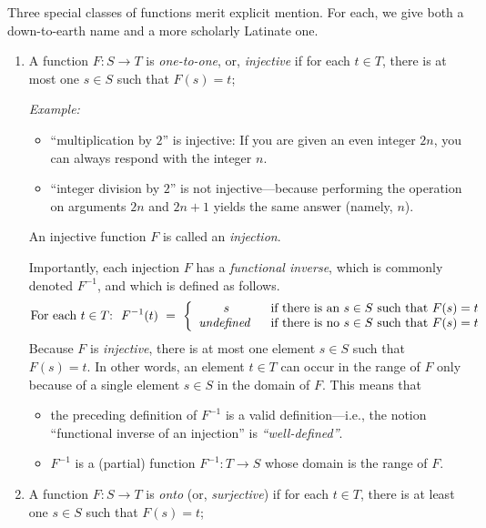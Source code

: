 \medskip

Three special classes of functions merit explicit mention.  For each, we give both a down-to-earth name and a more scholarly Latinate one.
\begin{enumerate}
\item
A function $F: S \rightarrow T$ is {\it one-to-one}, or, {\it injective} if for each $t \in T$, there is at most one $s \in S$ such that $F(s) = t$;

\medskip

{\em Example:}
\begin{itemize}
\item
 ``multiplication by $2$'' is injective: If you are given an even integer $2n$, you can always respond with the integer $n$.
\item
``integer division by $2$'' is not injective---because performing the operation on arguments $2n$ and $2n+1$ yields the same answer (namely, $n$).
\end{itemize}

An injective function $F$ is called an {\it injection}.

\smallskip


Importantly, each injection $F$ has a {\it functional inverse}, which is commonly denoted $F^{-1}$, and which is defined as follows.
\[
\mbox{For each $t \in T$:} \ \
F^{-1}(t) \ = \ \left\{
\begin{array}{cl}
s &
\mbox{ if there is an $s \in S$ such that $F(s) = t$} \\
\mbox{\it undefined } &
\mbox{ if there is no $s \in S$ such that $F(s) = t$}
\end{array}
\right.
\]
Because $F$ is {\em injective}, there is at most one element $s \in S$ such that $F(s)= t$.  In other words, an element $t \in T$ can occur in the range of $F$ only because of a single element $s \in S$ in the domain of $F$.  This means that
\begin{itemize}
\item
the preceding definition of $F^{-1}$ is a valid definition---i.e., the notion ``functional inverse of an injection'' is {\it ``well-defined''}.
\item
$F^{-1}$ is a (partial) function $F^{-1}: T \rightarrow S$ whose domain is the range of $F$.
\end{itemize}

\item
A function $F: S \rightarrow T$ is {\it onto} (or, {\it surjective}) if for each $t \in T$, there is at least one $s \in S$ such that $F(s) = t$;


\end{enumerate}
